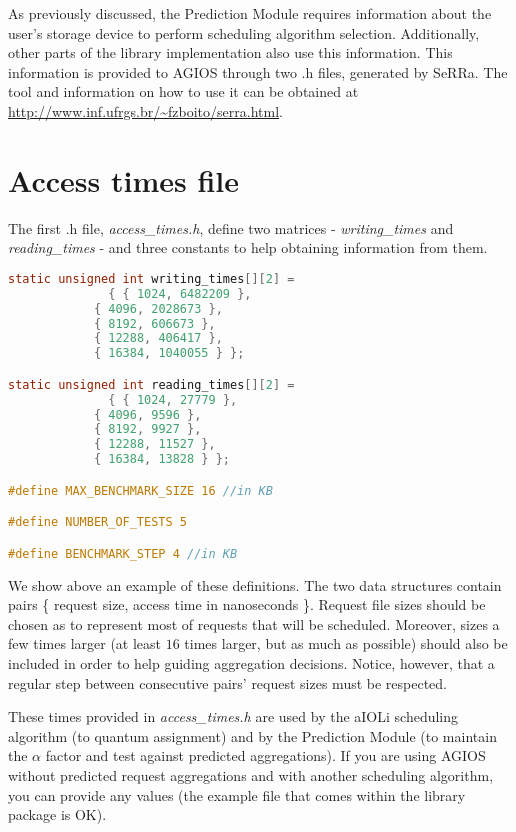 As previously discussed, the Prediction Module requires information about the user's storage device to perform scheduling algorithm selection. Additionally, other parts of the library implementation also use this information. This information is provided to AGIOS through two .h files, generated by SeRRa. The tool and information on how to use it can be obtained at \url{http://www.inf.ufrgs.br/~fzboito/serra.html}.

\section{Access times file}

The first .h file, \emph{access\_times.h}, define two matrices - \emph{writing\_times} and \emph{reading\_times} - and three constants to help obtaining information from them.

\begin{lstlisting}[language=C]
static unsigned int writing_times[][2] = 
		      { { 1024, 6482209 },
			{ 4096, 2028673 },
			{ 8192, 606673 },
			{ 12288, 406417 },
			{ 16384, 1040055 } };

static unsigned int reading_times[][2] = 
		      { { 1024, 27779 },
			{ 4096, 9596 },
			{ 8192, 9927 },
			{ 12288, 11527 },
			{ 16384, 13828 } };

#define MAX_BENCHMARK_SIZE 16 //in KB

#define NUMBER_OF_TESTS 5

#define BENCHMARK_STEP 4 //in KB
\end{lstlisting}

We show above an example of these definitions. The two data structures contain pairs \{ request size, access time in nanoseconds \}. Request file sizes should be chosen as to represent most of requests that will be scheduled. Moreover, sizes a few times larger (at least $16$ times larger, but as much as possible) should also be included in order to help guiding aggregation decisions. Notice, however, that a regular step between consecutive pairs' request sizes must be respected. 

These times provided in \emph{access\_times.h} are used by the aIOLi scheduling algorithm (to quantum assignment) and by the Prediction Module (to maintain the $\alpha$ factor and test against predicted aggregations). If you are using AGIOS without predicted request aggregations and with another scheduling algorithm, you can provide any values (the example file that comes within the library package is OK).

